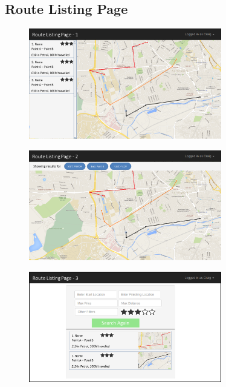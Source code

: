 \newpage 
\subsection{Route Listing Page}
\begin{figure}[!ht]
    \begin{center}
        \includegraphics[width=0.75\textwidth]{images/appendix/rlp1.png}
    \end{center}
    \vspace{-6mm}
\end{figure}

\begin{figure}[!ht]
    \begin{center}
        \includegraphics[width=0.75\textwidth]{images/appendix/rlp2.png}
    \end{center}
    \vspace{-6mm}
\end{figure}

\begin{figure}[!ht]
    \begin{center}
        \includegraphics[width=0.75\textwidth]{images/appendix/rlp3.png}
    \end{center}
    \vspace{-6mm}
\end{figure}

